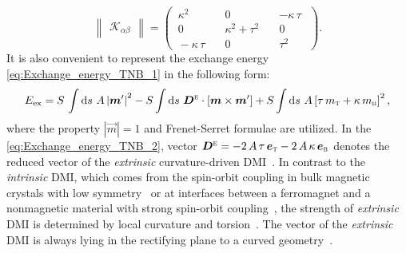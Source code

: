 \begin{equation} \label{eq:K_tensor_exchange}
\begin{Vmatrix} \mathcal{K}_{\alpha \beta} \end{Vmatrix} = \left(\begin{matrix*}  \, \kappa^2 \quad	& 0 \quad & - \kappa \, \tau \, \,  \\
\, 0 \quad & \kappa^2 + \tau^2 \quad & 0 \, \,  \\
\, - \kappa \, \tau \quad & 0 \quad &	\tau^2 \, \, 
\end{matrix*}\right).
\end{equation}
It is also convenient to represent the exchange energy \eqref{eq:Exchange_energy_TNB_1} in the following form:
\begin{equation} \label{eq:Exchange_energy_TNB_2}
E_{\textrm{ex}} =  S \, \int \textrm{d} s \, \, A \left| \vec{m}' \right|^2 - S \int \textrm{d} s \, \, \vec{D}^{\scriptsize \textsc{e}} \cdot [\vec{m} \times \vec{m}'] + S \int \textrm{d} s \, \, A \left[ \tau \, m_{\scriptsize \textsc{t}}  + \kappa \, m_{\scriptsize \textsc{b}} \right]^2, 
\end{equation}
where the property $|\vec{m}|=1$ and Frenet-Serret formulae are utilized. In the \eqref{eq:Exchange_energy_TNB_2}, vector $\vec{D}^{\scriptsize \textsc{e}} = - 2 \, A \, \tau \, \vec{e}_{\scriptsize \textsc{t}} - 2 \, A \, \kappa \, \vec{e}_{\scriptsize \textsc{b}}$ denotes the reduced vector of the \textit{extrinsic} curvature-driven DMI~\cite{Gaididei14,Sheka15,Sheka15c}.	In contrast to the \textit{intrinsic} DMI, which comes from the spin-orbit coupling in bulk magnetic crystals with low symmetry~\cite{Dzyaloshinsky58,Moriya60a} or at interfaces between a ferromagnet and a nonmagnetic material with strong spin-orbit coupling~\cite{Fert90,Crepieux98,Bode07,Yang15}, the strength of \textit{extrinsic} DMI is determined by local curvature and torsion~\cite{Pylypovskyi16,Volkov19c}. The vector of the \textit{extrinsic} DMI is always lying in the rectifying plane to a curved geometry~\cite{Volkov18}.

